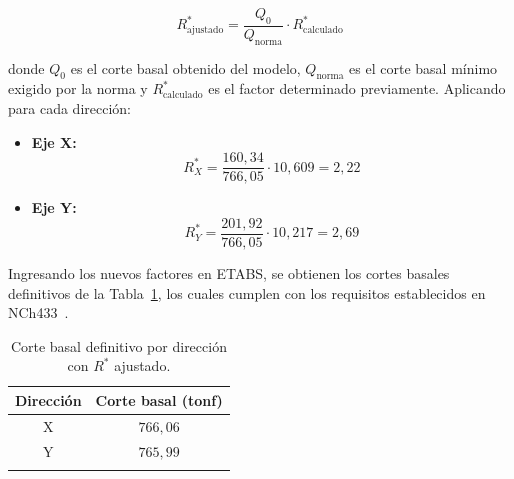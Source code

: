 \begin{equation}
    R^*_{\text{ajustado}} = \frac{Q_0}{Q_{\text{norma}}} \cdot R^*_{\text{calculado}}
\end{equation}

donde $Q_0$ es el corte basal obtenido del modelo, $Q_{\text{norma}}$ es el corte 
basal mínimo exigido por la norma y $R^*_{\text{calculado}}$ es el factor determinado 
previamente. Aplicando para cada dirección:

\begin{itemize}
    \item \textbf{Eje X:}
    \begin{equation}
        R^*_X = \frac{160{,}34}{766{,}05} \cdot 10{,}609 = 2{,}22
    \end{equation}

    \item \textbf{Eje Y:}
    \begin{equation}
        R^*_Y = \frac{201{,}92}{766{,}05} \cdot 10{,}217 = 2{,}69
    \end{equation}
\end{itemize}

Ingresando los nuevos factores en ETABS, se obtienen los cortes basales definitivos 
de la Tabla~\ref{tab:corte_basal_final}, los cuales cumplen con los requisitos 
establecidos en NCh433~\cite{NCh433:1996}.

\begin{table}[H]
    \centering
    \caption{Corte basal definitivo por dirección con $R^*$ ajustado.}
    \label{tab:corte_basal_final}
    \begin{tabular}{cc}
        \toprule
        \textbf{Dirección} & \textbf{Corte basal (tonf)} \\
        \midrule
        X & $766{,}06$ \\
        Y & $765{,}99$ \\
        \bottomrule
        \vspace{0.001cm}
    \end{tabular}
    
\end{table}